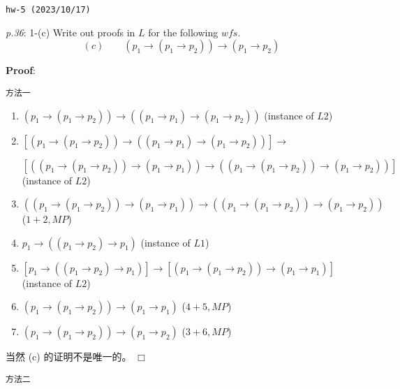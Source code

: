 \documentclass[UTF8,12pt,a4paper]{ctexart}
\begin{document}
\noindent\texttt{hw-5 (2023/10/17)}

\emph{p.36}: 1-(c) \quad
Write out proofs in $L$ for the following $wfs$.
\[
(c) \qquad  (p_1 \to (p_1 \to p_2)) \to (p_1 \to p_2)
\] 


\noindent\textbf{Proof}: 

\noindent\texttt{方法一}

\begin{enumerate}
	\item $ (p_1 \to (p_1 \to p_2)) \to ((p_1 \to p_1) \to (p_1 \to p_2)) $
	\hfill (instance of $L2$)
	
	\item $ [(p_1 \to (p_1 \to p_2)) \to ((p_1 \to p_1) \to (p_1 \to p_2))] \to  $
	
	$
	[( (p_1 \to (p_1 \to p_2)) \to (p_1 \to p_1))  \to
	( (p_1 \to (p_1 \to p_2)) \to (p_1 \to p_2)) ]
	$
	\hfill (instance of $L2$)
	
	\item $ ( (p_1 \to (p_1 \to p_2)) \to (p_1 \to p_1))  \to
	( (p_1 \to (p_1 \to p_2)) \to (p_1 \to p_2))$
	\hfill ($1+2,MP$)
	
	\item $p_1 \to ((p_1 \to p_2) \to p_1)$ 
	\hfill (instance of $L1$)
	
	\item $[p_1 \to ((p_1 \to p_2) \to p_1)] \to 
	[ (p_1 \to (p_1 \to p_2))  \to (p_1 \to p_1) ]$ 
	\hfill (instance of $L2$)
	
	\item $(p_1 \to (p_1 \to p_2))  \to (p_1 \to p_1)$
	\hfill ($4+5, MP$)
	
	\item $(p_1 \to (p_1 \to p_2)) \to (p_1 \to p_2)$ 
	\hfill ($3+6, MP$)
\end{enumerate}
当然 (c) 的证明不是唯一的。
\hfill $\Box$


\vspace{1em} 

\noindent\texttt{方法二}
\end{document}
